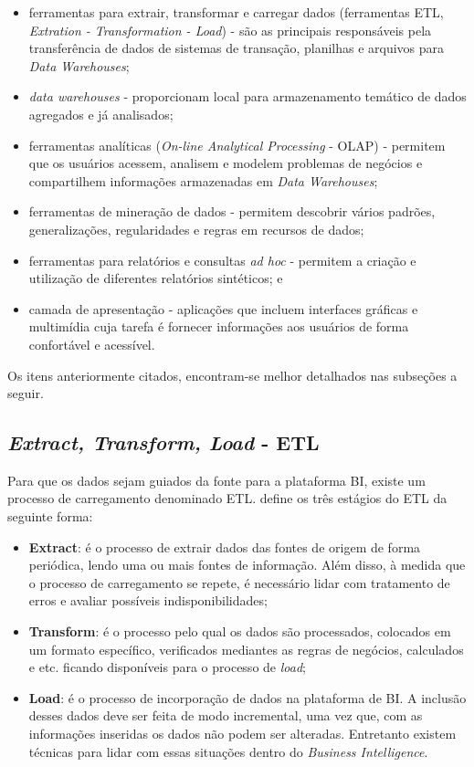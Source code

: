 \begin{itemize}
     \item ferramentas para extrair, transformar e carregar dados (ferramentas ETL, \textit{Extration - Transformation - Load}) - são as principais responsáveis pela transferência de dados de sistemas de transação, planilhas e arquivos para \textit{Data Warehouses};
     \item \textit{data warehouses} - proporcionam local para armazenamento temático de dados agregados e já analisados;
     \item ferramentas analíticas (\textit{On-line Analytical Processing} - OLAP) - permitem que os usuários acessem, analisem e modelem problemas de negócios e compartilhem informações armazenadas em \textit{Data Warehouses};
     \item ferramentas de mineração de dados - permitem descobrir vários padrões, generalizações, regularidades e regras em recursos de dados;
     \item ferramentas para relatórios e consultas \textit{ad hoc} - permitem a criação e utilização de diferentes relatórios sintéticos; e 
     \item camada de apresentação - aplicações que incluem interfaces gráficas e multimídia cuja tarefa é fornecer informações aos usuários de forma confortável e acessível.
\end{itemize}

Os itens anteriormente citados, encontram-se melhor detalhados nas subseções a seguir.

\subsection{\textit{Extract, Transform, Load} - ETL} \label{subD-etl}

Para que os dados sejam guiados da fonte para a plataforma BI, existe um processo de carregamento denominado ETL.  define os três estágios do ETL da seguinte forma:
\begin{itemize}
    \item \textbf{Extract}: é o processo de extrair dados das fontes de origem de forma periódica, lendo uma ou mais fontes de informação. Além disso, à medida que o processo de carregamento se repete, é necessário lidar com tratamento de erros e avaliar possíveis indisponibilidades;
    \item \textbf{Transform}: é o processo pelo qual os dados são processados, colocados em um formato específico, verificados mediantes as regras de negócios, calculados e etc. ficando disponíveis para o processo de \textit{load};
    \item \textbf{Load}: é o processo de incorporação de dados na plataforma de BI. A inclusão desses dados deve ser feita de modo incremental, uma vez que, com as informações inseridas os dados não podem ser alteradas. Entretanto existem técnicas para lidar com essas situações dentro do \textit{Business Intelligence}.
\end{itemize}
